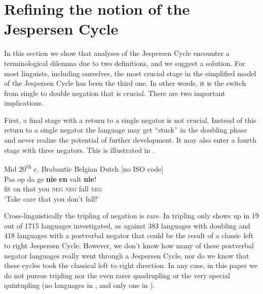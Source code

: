 ﻿\documentclass[output=paper,draft,draftmode,colorlinks,citecolor=brown]{langscibook}
\begin{document}
\section{Refining the notion of the Jespersen Cycle}\label{sec:int-2}

In this section we show that analyses of the Jespersen Cycle encounter a
terminological dilemma due to two definitions, and we suggest a solution.
For most linguists, including ourselves, the most crucial stage in the
simplified model of the Jespersen Cycle has been the third one. In other
words, it is the switch from single to double negation that is crucial.
There are two important implications.

First, a final stage with a return to a single negator is not crucial.
Instead of this return to a single negator the language may get ``stuck''
in the doubling phase and never realize the potential of further
development. It may also enter a fourth stage with three negators. This
is illustrated in .
%
\begin{exe}\ex \label{ex:int-brabantic}
          Mid 20\textsuperscript{th} c. Brabantic Belgian Dutch [no ISO code]
\\
\gll Pas op da ge \textbf{nie} \textbf{en} valt \textbf{nie}! \\
fit  on  that  you  \textsc{neg} \textsc{neg}  fall  \textsc{neg} \\
    \glt `Take care that you don't fall!'  
    \end{exe}
%
Cross-linguistically the tripling of negation is rare. In
\textcite[344]{Vossen2016} tripling only shows up in 19 out of 1715 languages
investigated, as against 383 languages with doubling and 418 languages with
a postverbal negator that could be the result of a classic left to right
Jespersen Cycle. However, we don't know how many of these postverbal
negator languages really went through a Jespersen Cycle, nor do we know
that these cycles took the classical left to right direction. In any case,
in this paper we do not pursue tripling \parencite[see][]{DevosAuwera2013}
nor the even rarer quadrupling \parencite[only 3 languages
in][343]{Vossen2016}  or the very special quintupling 
(no languages in \citealt[][]{Vossen2016}, and only one in 
\citealt[42]{AuweraVossen2017}).
\end{document}
